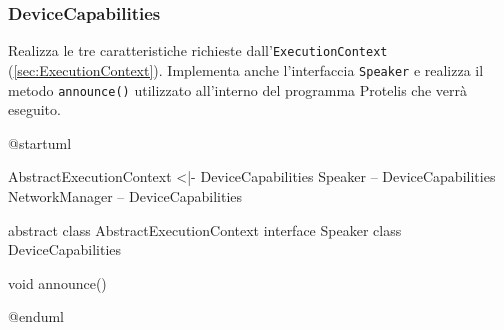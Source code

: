 \subsubsection{DeviceCapabilities}
Realizza le tre caratteristiche richieste
dall'\texttt{ExecutionContext} (\ref{sec:ExecutionContext}). Implementa anche
l'interfaccia \texttt{Speaker} e realizza il metodo \texttt{announce()}
utilizzato all'interno del programma Protelis che verrà eseguito.

\begin{center}
  \begin{plantuml}
    @startuml

    AbstractExecutionContext <|- DeviceCapabilities
    Speaker -- DeviceCapabilities
    NetworkManager -- DeviceCapabilities

    abstract class AbstractExecutionContext
    interface Speaker
    class DeviceCapabilities {
      void announce()

    }
    @enduml
  \end{plantuml}
\end{center}
